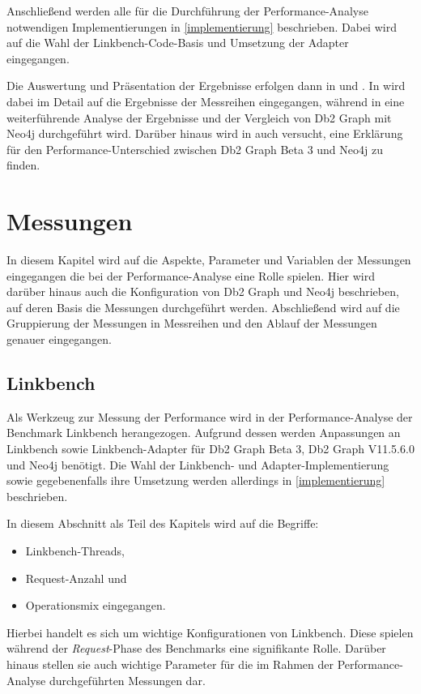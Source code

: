 Anschließend werden alle für die Durchführung der Performance-Analyse notwendigen Implementierungen in \autoref{implementierung} beschrieben. Dabei wird auf die Wahl der Linkbench-Code-Basis und Umsetzung der Adapter eingegangen. 

Die Auswertung und Präsentation der Ergebnisse erfolgen dann in  und . In  wird dabei im Detail auf die Ergebnisse der Messreihen eingegangen, während in  eine weiterführende Analyse der Ergebnisse und der Vergleich von Db2 Graph mit Neo4j durchgeführt wird. Darüber hinaus wird in  auch versucht, eine Erklärung für den Performance-Unterschied zwischen Db2 Graph Beta 3 und Neo4j zu finden. 

\chapter{Messungen}
\label{messungen}
In diesem Kapitel wird auf die Aspekte, Parameter und Variablen der Messungen eingegangen die bei der Performance-Analyse eine Rolle spielen. Hier wird darüber hinaus auch die Konfiguration von Db2 Graph und Neo4j beschrieben, auf deren Basis die Messungen durchgeführt werden. Abschließend wird auf die Gruppierung der Messungen in Messreihen und den Ablauf der Messungen genauer eingegangen.  

\section{Linkbench}
Als Werkzeug zur Messung der Performance wird in der Performance-Analyse der Benchmark Linkbench herangezogen. Aufgrund dessen werden Anpassungen an Linkbench  sowie Linkbench-Adapter für Db2 Graph Beta 3, Db2 Graph V11.5.6.0 und Neo4j benötigt. Die Wahl der Linkbench- und Adapter-Implementierung sowie gegebenenfalls ihre Umsetzung werden allerdings in \autoref{implementierung} beschrieben. 

In diesem Abschnitt als Teil des Kapitels  wird auf die Begriffe: 
\begin{itemize}
    \item Linkbench-Threads,
    \item Request-Anzahl und
    \item Operationsmix eingegangen.
\end{itemize}
Hierbei handelt es sich um wichtige Konfigurationen von Linkbench. Diese spielen während der \textit{Request}-Phase des Benchmarks eine signifikante Rolle. Darüber hinaus stellen sie auch wichtige Parameter für die im Rahmen der Performance-Analyse durchgeführten Messungen dar. 

